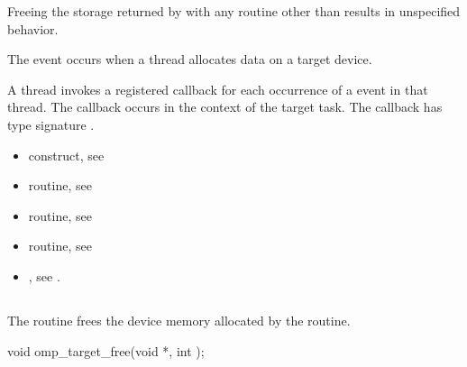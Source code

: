 \begin{ccppspecific}
Freeing the storage returned by  with any routine
other than  results in unspecified behavior.

\events
The  event occurs when a thread allocates data on a target device.

\tools

A thread invokes a registered 
callback for each occurrence of a  event in that thread. 
The callback occurs in the context of the target task.  The callback has type signature
. 


\crossreferences
\begin{itemize}
\item {} construct, see 

\item {} routine, see 

\item {} routine, see 

\item {} routine, see 

\item {}, see 
.

\end{itemize}



\subsection{}
\label{subsec:omp_target_free}
\summary
The  routine frees the device memory allocated by the  routine.

\begin{figure}[t!]
\end{figure}

\format
\begin{ompcFunction}
void omp_target_free(void *, int );
\end{ompcFunction}


\end{ccppspecific}

